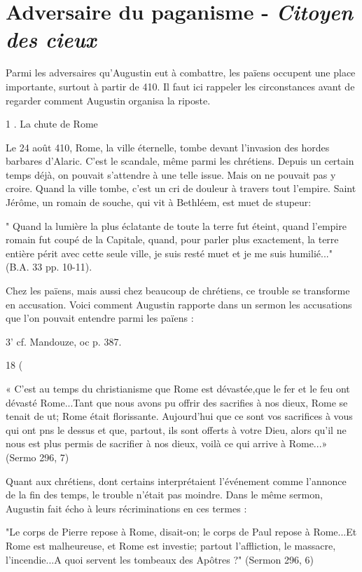 \section{Adversaire du paganisme - \textit{Citoyen des cieux}}
 


Parmi les adversaires qu'Augustin eut à combattre, les païens occupent une place importante, surtout à partir de 410. Il faut ici rappeler les circonstances avant de regarder comment Augustin organisa la riposte.

1 . La	chute de	Rome

Le 24 août 410, Rome, la ville éternelle, tombe devant l'invasion des hordes barbares d'Alaric. C'est le scandale, même parmi les chrétiens. Depuis un certain temps déjà, on pouvait s'attendre à une telle issue. Mais on ne pouvait pas y croire. Quand la ville tombe, c'est un cri de douleur à travers tout l'empire. Saint Jérôme, un romain de souche, qui vit à Bethléem, est muet de stupeur:

" Quand la lumière la plus éclatante de toute la terre fut éteint, quand l'empire romain fut coupé de la Capitale, quand, pour parler plus exactement, la terre entière périt avec cette seule ville, je suis resté muet et je me suis humilié..." (B.A. 33 pp. 10-11).

Chez les païens, mais aussi chez beaucoup de chrétiens, ce trouble se transforme en accusation. Voici comment Augustin rapporte dans un sermon les accusations que l'on pouvait entendre parmi les païens :



3' cf. Mandouze, oc p. 387.

18
(
 
« C'est au temps du christianisme que Rome est dévastée,que le fer et le feu ont dévasté Rome...Tant que nous avons pu offrir des sacrifies à nos dieux, Rome se tenait de ut; Rome était florissante. Aujourd'hui que ce sont vos sacrifices à vous qui ont pns le dessus et que, partout, ils sont offerts à votre Dieu, alors qu'il ne nous est plus permis de sacrifier à nos dieux, voilà ce qui arrive à Rome...» (Sermo 296, 7)

Quant aux chrétiens, dont certains interprétaient l'événement comme l'annonce de la fin des temps, le trouble n'était pas moindre. Dans le même sermon, Augustin fait écho à leurs récriminations en ces termes :

"Le corps de Pierre repose à Rome, disait-on; le corps de Paul repose à Rome...Et Rome est malheureuse, et Rome est investie; partout l'affliction, le massacre, l'incendie...A quoi servent les tombeaux des Apôtres ?" (Sermon 296, 6)


